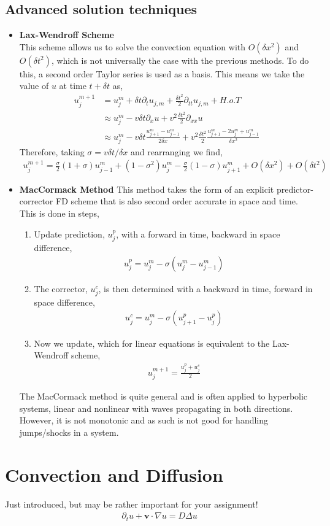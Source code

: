 \documentclass[11pt,a4paper]{report}
\theoremstyle{definition}
\begin{document}
\subsection{Advanced solution techniques}
\begin{itemize}
	\item \textbf{Lax-Wendroff Scheme}\\
	This scheme allows us to solve the convection equation with $O(\delta x^2)$ and $O(\delta t^2)$, which is not universally the case with the previous methods. To do this, a second order Taylor series is used as a basis. This means we take the value of $u$ at time $t+\delta t$ as,
	\begin{align*}
		u_j^{m+1} &= u_j^m + \delta t \partial_t u_{j,m} + \frac{\delta t^2}{2} \partial_{tt} u_{j,m} + H.o.T \\
				  &\approx u_j^m -  v \delta t\partial_x u +  v^2\frac{\delta t^2}{2} \partial_{xx} u \\
				  &\approx u_j^m -  v \delta t\frac{u_{j+1}^m - u_{j-1}^m}{2\delta x} +  v^2\frac{\delta t^2}{2}\frac{u_{j+1}^m -2u_j^m + u_{j-1}^m}{\delta x^2}
	\end{align*}
	Therefore, taking $\sigma = v\delta t/\delta x$ and rearranging we find,
	\begin{align*}
		u_j^{m+1} = \frac{\sigma}{2} (1+\sigma) u^m_{j-1} + (1-\sigma^2)u_j^m - \frac{\sigma}{2}(1-\sigma)u_{j+1}^m + O(\delta x^2) + O(\delta t^2)
	\end{align*}
	\item \textbf{MacCormack Method}
	This method takes the form of an explicit predictor-corrector FD scheme that is also second order accurate in space and time. This is done in steps,
	\begin{enumerate}
		\item Update prediction, $u_j^p$, with a forward in time, backward in space difference,
		\begin{align*}
			u_j^p = u_j^m - \sigma (u_j^m - u^m_{j-1})
		\end{align*}
		\item The corrector, $u_j^c$, is then determined with a backward in time, forward in space difference,
		\begin{align*}
			u_j^c = u_j^m - \sigma(u_{j+1}^p - u_j^p)
		\end{align*}
		\item Now we update, which for linear equations is equivalent to the Lax-Wendroff scheme,
		\begin{align*}
			u_j^{m+1} = \frac{u_j^p + u_j^c}{2}
		\end{align*}
	\end{enumerate}
	The MacCormack method is quite general and is often applied to hyperbolic systems, linear and nonlinear with waves propagating in both directions. However, it is not monotonic and as such is not good for handling jumps/shocks in a system.
\end{itemize}

\section{Convection and Diffusion}
Just introduced, but may be rather important for your assignment!
\begin{align*}
	\partial_t u + \mathbf{v} \cdot \nabla u = D\Delta u
\end{align*}
\end{document}
